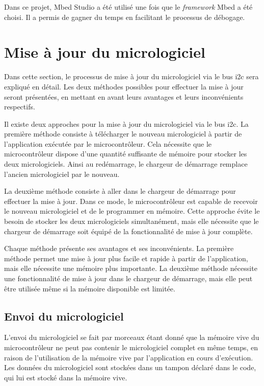 Dans ce projet, Mbed Studio a été utilisé une fois que le \textit{\gls{framework}} Mbed a été choisi.
Il a permis de gagner du temps en facilitant le processus de débogage.

\section{Mise à jour du micrologiciel}

Dans cette section, le processus de mise à jour du micrologiciel via le bus \gls{i2c} sera expliqué en détail.
Les deux méthodes possibles pour effectuer la mise à jour seront présentées, en mettant en avant leurs avantages et leurs inconvénients respectifs.

Il existe deux approches pour la mise à jour du micrologiciel via le bus \gls{i2c}.
La première méthode consiste à télécharger le nouveau micrologiciel à partir de l'application exécutée par le microcontrôleur.
Cela nécessite que le microcontrôleur dispose d'une quantité suffisante de mémoire pour stocker les deux micrologiciels.
Ainsi au redémarrage, le chargeur de démarrage remplace l'ancien micrologiciel par le nouveau.

La deuxième méthode consiste à aller dans le chargeur de démarrage pour effectuer la mise à jour.
Dans ce mode, le microcontrôleur est capable de recevoir le nouveau micrologiciel et de le programmer en mémoire.
Cette approche évite le besoin de stocker les deux micrologiciels simultanément, mais elle nécessite que le chargeur de démarrage soit équipé de la fonctionnalité de mise à jour complète.

Chaque méthode présente ses avantages et ses inconvénients.
La première méthode permet une mise à jour plus facile et rapide à partir de l'application, mais elle nécessite une mémoire plus importante.
La deuxième méthode nécessite une fonctionnalité de mise à jour dans le chargeur de démarrage, mais elle peut être utilisée même si la mémoire disponible est limitée.

\subsection{Envoi du micrologiciel}

L'envoi du micrologiciel se fait par morceaux étant donné que la mémoire vive du microcontrôleur ne peut pas contenir le micrologiciel complet en même temps, en raison de l'utilisation de la mémoire vive par l'application en cours d'exécution.
Les données du micrologiciel sont stockées dans un tampon déclaré dans le code, qui lui est stocké dans la mémoire vive.

